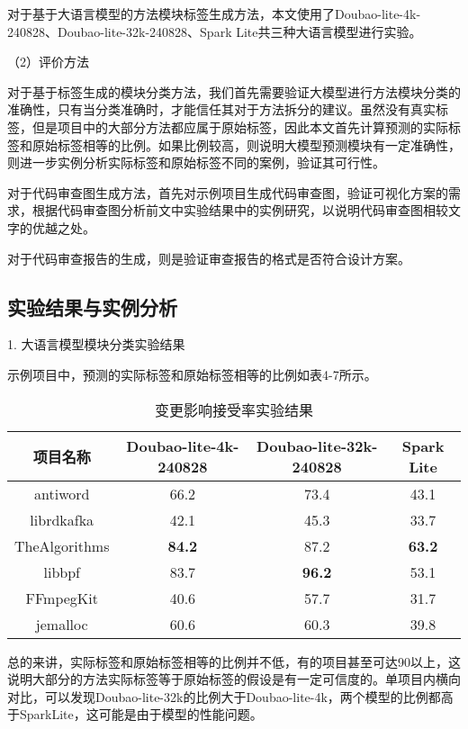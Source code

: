 对于基于大语言模型的方法模块标签生成方法，本文使用了Doubao-lite-4k-240828、Doubao-lite-32k-240828、Spark Lite共三种大语言模型进行实验。

（2）评价方法



对于基于标签生成的模块分类方法，我们首先需要验证大模型进行方法模块分类的准确性，只有当分类准确时，才能信任其对于方法拆分的建议。虽然没有真实标签，但是项目中的大部分方法都应属于原始标签，因此本文首先计算预测的实际标签和原始标签相等的比例。如果比例较高，则说明大模型预测模块有一定准确性，则进一步实例分析实际标签和原始标签不同的案例，验证其可行性。

对于代码审查图生成方法，首先对示例项目生成代码审查图，验证可视化方案的需求，根据代码审查图分析前文中实验结果中的实例研究，以说明代码审查图相较文字的优越之处。

对于代码审查报告的生成，则是验证审查报告的格式是否符合设计方案。

\subsection{实验结果与实例分析}

1. 大语言模型模块分类实验结果

示例项目中，预测的实际标签和原始标签相等的比例如表4-7所示。


\begin{table}[htbp]
\caption{变更影响接受率实验结果}
\vspace{0.5em}\centering\wuhao
\begin{tabular}{cccc}
\toprule
项目名称 & Doubao-lite-4k-240828 & Doubao-lite-32k-240828 & Spark Lite \\
\midrule
antiword & 66.2 & 73.4 & 43.1 \\
librdkafka & 42.1 & 45.3 & 33.7 \\
TheAlgorithms & \textbf{84.2} & 87.2 & \textbf{63.2} \\
libbpf & 83.7 & \textbf{96.2} & 53.1 \\
FFmpegKit & 40.6 & 57.7 & 31.7 \\
jemalloc & 60.6 & 60.3 & 39.8 \\
\bottomrule
\end{tabular}
\end{table}

总的来讲，实际标签和原始标签相等的比例并不低，有的项目甚至可达90以上，这说明大部分的方法实际标签等于原始标签的假设是有一定可信度的。单项目内横向对比，可以发现Doubao-lite-32k的比例大于Doubao-lite-4k，两个模型的比例都高于SparkLite，这可能是由于模型的性能问题。

